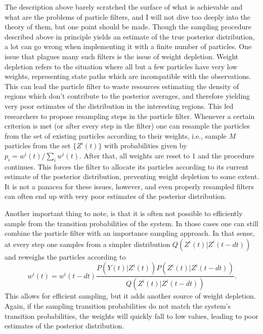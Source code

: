 {The description above barely scratched the surface of what is achievable and what are the problems of particle filters, and I will not dive too deeply into the theory of
them, but one point should be made. Though the sampling procedure described above in principle yields an estimate of the true posterior distribution, a lot can
go wrong when implementing it with a finite number of particles. One issue that plagues many such filters is the issue of weight depletion. Weight depletion refers
to the situation where all but a few particles have very low weights, representing state paths which are incompatible with the observations. This can lead the particle
filter to waste resources estimating the density of regions which don't contribute to the posterior averages, and therefore yielding very poor estimates of the distribution
in the interesting regions. This led researchers to propose resampling steps in the particle filter. Whenever a certain criterion is met (or after every step in the filter) one 
can resample the particles from the set of existing particles according to their weights, i.e., sample $M$ particles from the set $\{Z^i(t)\}$ with probabilities given by
$p_i = w^i(t)/\sum_i w^i(t)$. After that, all weights are reset to 1 and the procedure continues. This forces
the filter to allocate its particles according to its current estimate of the posterior distribution, preventing weight depletion to some extent. It is not a panacea for these 
issues, however, and even properly resampled filters can often end up with very poor estimates of the posterior distribution.
\par

Another important thing to note, is that it is often not possible to efficiently sample from the transition probabilities of the system. In those cases one can still combine
the particle filter with an importance sampling approach. In that sense, at every step one samples from a simpler distribution $Q(Z^i(t)|Z^i(t-dt))$ and reweighs the 
particles according to 
\[
w^i(t) = w^i(t-dt) \frac{P(Y(t) | Z^i(t)) P(Z^i(t)|Z^i(t-dt))}{Q(Z^i(t)|Z^i(t-dt))}.
\]
This allows for efficient sampling, but it adds another source of
weight depletion. Again, if the sampling transition probabilities do not match the system's transition probabilities, the weights will quickly fall to low values, leading to
poor estimates of the posterior distribution.
\par

}
